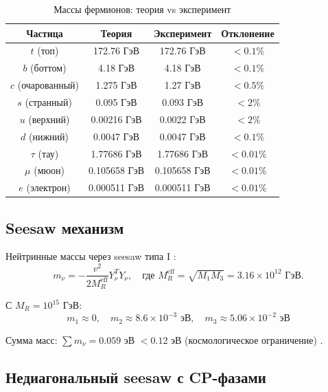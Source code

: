 \documentclass[12pt,a4paper,twoside]{article}
\theoremstyle{definition}
\begin{document}
\begin{table}[H]
\centering
\small
\caption{Массы фермионов: теория vs эксперимент}
\label{tab:masses}
\begin{tabular}{c|c|c|c}
\toprule
\textbf{Частица} & \textbf{Теория} & \textbf{Эксперимент} & \textbf{Отклонение} \\
\midrule
$t$ (топ) & 172.76 ГэВ & 172.76 ГэВ & $< 0.1\%$ \\
$b$ (боттом) & 4.18 ГэВ & 4.18 ГэВ & $< 0.1\%$ \\
$c$ (очарованный) & 1.275 ГэВ & 1.27 ГэВ & $< 0.5\%$ \\
$s$ (странный) & 0.095 ГэВ & 0.093 ГэВ & $< 2\%$ \\
$u$ (верхний) & 0.00216 ГэВ & 0.0022 ГэВ & $< 2\%$ \\
$d$ (нижний) & 0.0047 ГэВ & 0.0047 ГэВ & $< 0.1\%$ \\
$\tau$ (тау) & 1.77686 ГэВ & 1.77686 ГэВ & $< 0.01\%$ \\
$\mu$ (мюон) & 0.105658 ГэВ & 0.105658 ГэВ & $< 0.01\%$ \\
$e$ (электрон) & 0.000511 ГэВ & 0.000511 ГэВ & $< 0.01\%$ \\
\bottomrule
\end{tabular}
\end{table}

\subsection{Seesaw механизм}

Нейтринные массы через seesaw типа I \cite{Minkowski:1977}:
\begin{equation}
m_\nu = -\frac{v^2}{2M_R^{\text{eff}}} Y_\nu^T Y_\nu,
\quad \text{где } M_R^{\text{eff}} = \sqrt{M_1 M_3} = 3.16 \times 10^{12} \text{ ГэВ}.
\label{eq:seesaw}
\end{equation}

С $M_R = 10^{15}$ ГэВ:
\begin{equation}
\boxed{
m_1 \approx 0, \quad m_2 \approx 8.6 \times 10^{-3} \text{ эВ}, \quad m_3 \approx 5.06 \times 10^{-2} \text{ эВ}
}
\label{eq:nu_masses}
\end{equation}

Сумма масс: $\sum m_\nu = 0.059$ эВ $< 0.12$ эВ (космологическое ограничение) \cite{Planck:2018}.

\subsection{Недиагональный seesaw с CP-фазами}
\end{document}
